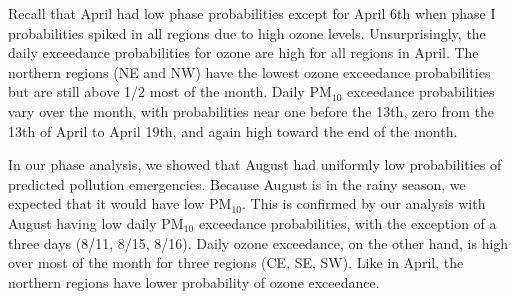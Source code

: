 \documentclass[alpha-refs]{wiley-article}
\begin{document}
Recall that April had low phase probabilities except for April 6th when phase I probabilities spiked in all regions due to high ozone levels. Unsurprisingly, the daily exceedance probabilities for ozone are high for all regions in April. The northern regions (NE and NW) have the lowest ozone exceedance probabilities but are still above 1/2 most of the month. Daily $\text{PM}_{10}$ exceedance probabilities vary over the month, with probabilities near one before the 13th, zero from the 13th of April to April 19th, and again high toward the end of the month.

In our phase analysis, we showed that August had uniformly low probabilities of predicted pollution emergencies. Because August is in the rainy season, we expected that it would have low $\text{PM}_{10}$. This is confirmed by our analysis with August having low daily $\text{PM}_{10}$ exceedance probabilities, with the exception of a three days (8/11, 8/15, 8/16). Daily ozone exceedance, on the other hand, is high over most of the month for three regions (CE, SE, SW). Like in April, the northern regions have lower probability of ozone exceedance. 
\end{document}
